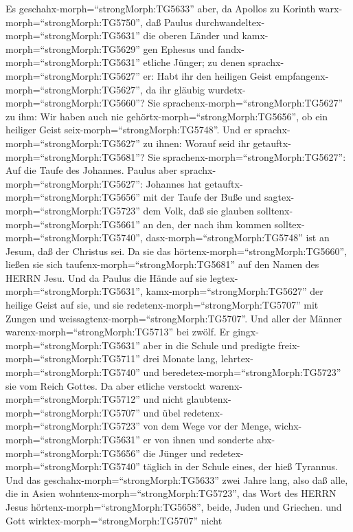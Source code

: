  Es geschahx-morph=``strongMorph:TG5633'' aber, da Apollos
zu Korinth warx-morph=``strongMorph:TG5750'', daß Paulus
durchwandeltex-morph=``strongMorph:TG5631'' die oberen Länder und
kamx-morph=``strongMorph:TG5629'' gen Ephesus und
fandx-morph=``strongMorph:TG5631'' etliche Jünger;  zu denen
sprachx-morph=``strongMorph:TG5627'' er: Habt ihr den heiligen Geist
empfangenx-morph=``strongMorph:TG5627'', da ihr gläubig
wurdetx-morph=``strongMorph:TG5660''? Sie
sprachenx-morph=``strongMorph:TG5627'' zu ihm: Wir haben auch nie
gehörtx-morph=``strongMorph:TG5656'', ob ein heiliger Geist
seix-morph=``strongMorph:TG5748''.  Und er
sprachx-morph=``strongMorph:TG5627'' zu ihnen: Worauf seid ihr
getauftx-morph=``strongMorph:TG5681''? Sie
sprachenx-morph=``strongMorph:TG5627'': Auf die Taufe des Johannes.
 Paulus aber sprachx-morph=``strongMorph:TG5627'': Johannes
hat getauftx-morph=``strongMorph:TG5656'' mit der Taufe der Buße und
sagtex-morph=``strongMorph:TG5723'' dem Volk, daß sie glauben
solltenx-morph=``strongMorph:TG5661'' an den, der nach ihm kommen
solltex-morph=``strongMorph:TG5740'', dasx-morph=``strongMorph:TG5748''
ist an Jesum, daß der Christus sei.  Da sie das
hörtenx-morph=``strongMorph:TG5660'', ließen sie sich
taufenx-morph=``strongMorph:TG5681'' auf den Namen des HERRN Jesu.
 Und da Paulus die Hände auf sie
legtex-morph=``strongMorph:TG5631'', kamx-morph=``strongMorph:TG5627''
der heilige Geist auf sie, und sie redetenx-morph=``strongMorph:TG5707''
mit Zungen und weissagtenx-morph=``strongMorph:TG5707''. 
Und aller der Männer warenx-morph=``strongMorph:TG5713'' bei zwölf.
 Er gingx-morph=``strongMorph:TG5631'' aber in die Schule
und predigte freix-morph=``strongMorph:TG5711'' drei Monate lang,
lehrtex-morph=``strongMorph:TG5740'' und
beredetex-morph=``strongMorph:TG5723'' sie vom Reich Gottes.
 Da aber etliche verstockt
warenx-morph=``strongMorph:TG5712'' und nicht
glaubtenx-morph=``strongMorph:TG5707'' und übel
redetenx-morph=``strongMorph:TG5723'' von dem Wege vor der Menge,
wichx-morph=``strongMorph:TG5631'' er von ihnen und sonderte
abx-morph=``strongMorph:TG5656'' die Jünger und
redetex-morph=``strongMorph:TG5740'' täglich in der Schule eines, der
hieß Tyrannus.  Und das
geschahx-morph=``strongMorph:TG5633'' zwei Jahre lang, also daß alle,
die in Asien wohntenx-morph=``strongMorph:TG5723'', das Wort des HERRN
Jesus hörtenx-morph=``strongMorph:TG5658'', beide, Juden und Griechen.
 und Gott wirktex-morph=``strongMorph:TG5707'' nicht
